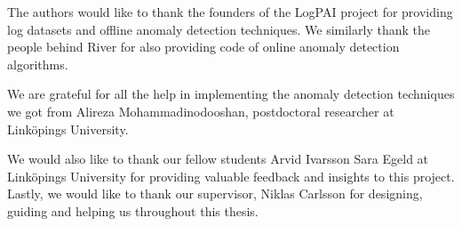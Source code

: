

The authors would like to thank the founders of the LogPAI project for providing log datasets and offline anomaly detection techniques. We similarly thank the people behind River for also providing code of online anomaly detection algorithms.

We are grateful for all the help in implementing the anomaly detection techniques we got from Alireza Mohammadinodooshan, postdoctoral researcher at Linköpings University.

We would also like to thank our fellow students Arvid Ivarsson Sara Egeld at Linköpings University for providing valuable feedback and insights to this project. Lastly, we would like to thank our supervisor, Niklas Carlsson for designing, guiding and helping us throughout this thesis.

